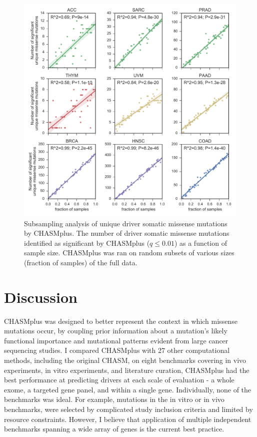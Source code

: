\begin{figure}
  \centering
  \makeatletter
  \let\@currsize\normalsize
  \includegraphics[width=0.9\linewidth]{figures/chapter6/sub_sampling_num_unique.pdf}
  \caption[Subsampling analysis of unique driver somatic missense mutations by CHASMplus.]{Subsampling analysis of unique driver somatic missense mutations by CHASMplus. The number of driver somatic missense mutations identified as significant by CHASMplus ($q \leq 0.01$) as a function of sample size. CHASMplus was ran on random subsets of various sizes (fraction of samples) of the full data.}
  \label{fig:chasmplus_subsampling}
\end{figure}

\section{Discussion}

CHASMplus was designed to better represent the context in which missense mutations occur, by coupling prior information about a mutation's likely functional importance and mutational patterns evident from large cancer sequencing studies. I compared CHASMplus with 27 other computational methods, including the original CHASM, on eight benchmarks covering in vivo experiments, in vitro experiments, and literature curation, CHASMplus had the best performance at predicting drivers at each scale of evaluation - a whole exome, a targeted gene panel, and within a single gene.   Individually, none of the benchmarks was ideal.  For example, mutations in the in vitro or in vivo benchmarks, were selected by complicated study inclusion criteria and limited by resource constraints.  However, I believe that application of multiple independent benchmarks spanning a wide array of genes is the current best practice.

